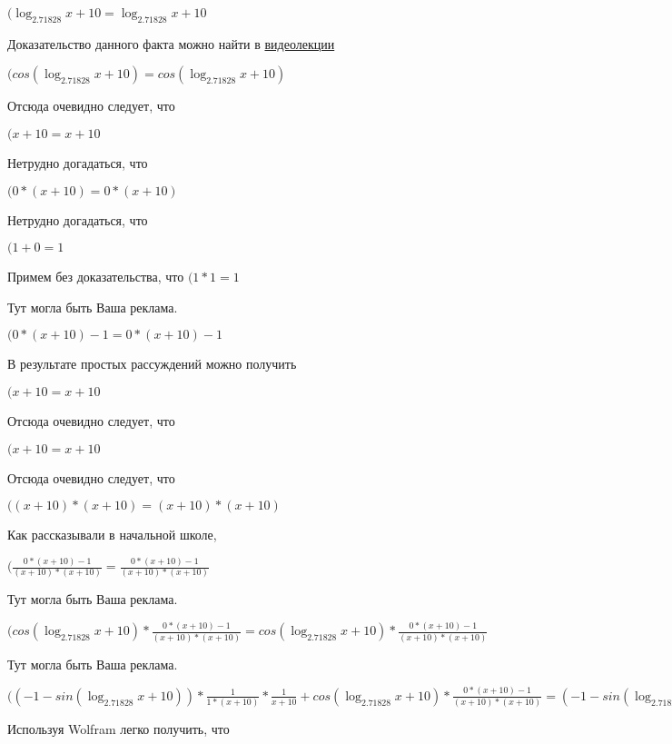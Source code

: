 \documentclass[12pt,a4paper,fleqn]{article}
\theoremstyle{definition}
\begin{document}
$(\log_{ 2.71828 }{ x  +  10 } = \log_{ 2.71828 }{ x  +  10 }$

Доказательство данного факта можно найти в \href{https://www.youtube.com/watch?v=dQw4w9WgXcQ}{видеолекции}

$(cos(\log_{ 2.71828 }{ x  +  10 }) = cos(\log_{ 2.71828 }{ x  +  10 })$

Отсюда очевидно следует, что

$( x  +  10  =  x  +  10 $

Нетрудно догадаться, что

$( 0  * ( x  +  10 ) =  0  * ( x  +  10 )$

Нетрудно догадаться, что

$( 1  +  0  =  1 $

Примем без доказательства, что
$( 1  *  1  =  1 $

Тут могла быть Ваша реклама.

$( 0  * ( x  +  10 ) -  1  =  0  * ( x  +  10 ) -  1 $

В результате простых рассуждений можно получить

$( x  +  10  =  x  +  10 $

Отсюда очевидно следует, что

$( x  +  10  =  x  +  10 $

Отсюда очевидно следует, что

$(( x  +  10 ) * ( x  +  10 ) = ( x  +  10 ) * ( x  +  10 )$

Как рассказывали в начальной школе,

$(\frac{ 0  * ( x  +  10 ) -  1 }{( x  +  10 ) * ( x  +  10 )}
 = \frac{ 0  * ( x  +  10 ) -  1 }{( x  +  10 ) * ( x  +  10 )}
$

Тут могла быть Ваша реклама.

$(cos(\log_{ 2.71828 }{ x  +  10 }) * \frac{ 0  * ( x  +  10 ) -  1 }{( x  +  10 ) * ( x  +  10 )}
 = cos(\log_{ 2.71828 }{ x  +  10 }) * \frac{ 0  * ( x  +  10 ) -  1 }{( x  +  10 ) * ( x  +  10 )}
$

Тут могла быть Ваша реклама.

$(( -1  - sin(\log_{ 2.71828 }{ x  +  10 })) * \frac{ 1 }{ 1  * ( x  +  10 )}
 * \frac{ 1 }{ x  +  10 }
 + cos(\log_{ 2.71828 }{ x  +  10 }) * \frac{ 0  * ( x  +  10 ) -  1 }{( x  +  10 ) * ( x  +  10 )}
 = ( -1  - sin(\log_{ 2.71828 }{ x  +  10 })) * \frac{ 1 }{ 1  * ( x  +  10 )}
 * \frac{ 1 }{ x  +  10 }
 + cos(\log_{ 2.71828 }{ x  +  10 }) * \frac{ 0  * ( x  +  10 ) -  1 }{( x  +  10 ) * ( x  +  10 )}
$

Используя Wolfram легко получить, что
\end{document}
